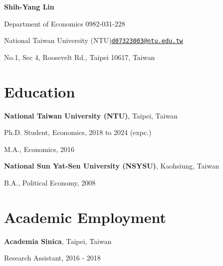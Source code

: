 \documentclass{article}
\newcommand{\cvsection}[1]{\section*{\rmfamily#1}}
\begin{document}
\begin{center}
    \Huge{
    \rmfamily
    \textbf{Shih-Yang Lin}}
\end{center}
\vspace{20pt}


\setlength{\parskip}{1pt}
\renewcommand{\arraystretch}{1.25}


\noindent Department of Economics \hfill 0982-031-228

\noindent National Taiwan University (NTU)\hfill \href{mailto:d07323003@ntu.edu.tw}{\texttt{d07323003@ntu.edu.tw}}

\noindent No.1, Sec 4, Roosevelt Rd., Taipei 10617, Taiwan\hfill %


\setlength{\parskip}{3pt}







\cvsection{Education}
\indent 

\textbf{National Taiwan University (NTU)}, Taipei, Taiwan

\hspace{2em}Ph.D. Student, Economics, 2018 to 2024 (expc.)

\hspace{2em}M.A., Economics, 2016

\textbf{National Sun Yat-Sen University (NSYSU)}, Kaohsiung, Taiwan

\hspace{2em}B.A., Political Economy, 2008







\cvsection{Academic Employment}
\indent

\textbf{Academia Sinica}, Taipei, Taiwan

\hspace{2em}Research Assistant, 2016 - 2018
\end{document}
